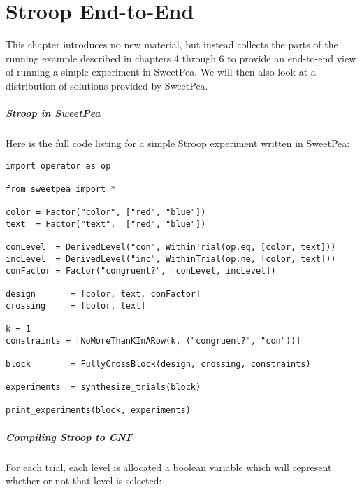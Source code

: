 \chapter{Stroop End-to-End}

This chapter introduces no new material, but instead collects the parts of the running example described in chapters 4 through 6 to provide an end-to-end view of running a simple experiment in SweetPea. We will then also look at a distribution of solutions provided by SweetPea.

\paragraph*{Stroop in SweetPea}

Here is the full code listing for a simple Stroop experiment written in SweetPea:

\begin{verbatim}
import operator as op

from sweetpea import *

color = Factor("color", ["red", "blue"])
text  = Factor("text",  ["red", "blue"])

conLevel  = DerivedLevel("con", WithinTrial(op.eq, [color, text]))
incLevel  = DerivedLevel("inc", WithinTrial(op.ne, [color, text]))
conFactor = Factor("congruent?", [conLevel, incLevel])

design       = [color, text, conFactor]
crossing     = [color, text]

k = 1
constraints = [NoMoreThanKInARow(k, ("congruent?", "con"))]

block        = FullyCrossBlock(design, crossing, constraints)

experiments  = synthesize_trials(block)

print_experiments(block, experiments)
\end{verbatim}


\paragraph*{Compiling Stroop to CNF}

For each trial, each level is allocated a boolean variable which will represent whether or not that level is selected:

